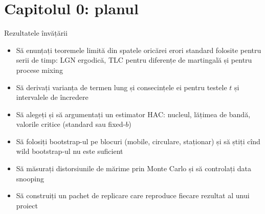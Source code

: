 \section{Capitolul 0: planul}

\begin{frame}{Rezultatele învățării}
\itemsize{\small}
\begin{itemize}
    \item Să enunțați teoremele limită din spatele oricărei erori standard folosite pentru serii de timp: LGN ergodică, TLC pentru diferențe de martingală și pentru procese mixing
    \item Să derivați varianța de termen lung și consecințele ei pentru testele $t$ și intervalele de încredere
    \item Să alegeți și să argumentați un estimator HAC: nucleul, lățimea de bandă, valorile critice (standard sau fixed-$b$)
    \item Să folosiți bootstrap-ul pe blocuri (mobile, circulare, staționar) și să știți cînd wild bootstrap-ul nu este suficient
    \item Să măsurați distorsiunile de mărime prin Monte Carlo și să controlați data snooping
    \item Să construiți un pachet de replicare care reproduce fiecare rezultat al unui proiect
\end{itemize}
\end{frame}

